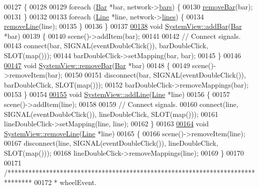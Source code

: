 \begin{DoxyCode}
00127 \{
00128 
00129   \textcolor{keywordflow}{foreach} (\hyperlink{class_bar}{Bar} *bar, network->\hyperlink{class_network_a7fe628f7de34a96235cbd3f2cee4aff2}{bars}) \{
00130     \hyperlink{group___graphics_ga1e96b08395a2f1b961dedbb3e8c99a50}{removeBar}(bar);
00131   \}
00132 
00133   \textcolor{keywordflow}{foreach} (\hyperlink{class_line}{Line} *line, network->\hyperlink{class_network_acda0fd42e712e460a08a0e96511ee7eb}{lines}) \{
00134     \hyperlink{group___graphics_ga4af1d763d9b9c02933e62d1f6231ad18}{removeLine}(line);
00135   \}
00136 \}
00137 
\hypertarget{systemview_8cpp_source_l00138}{}\hyperlink{group___graphics_gac4e02019d41c203c788ff1e6f3ee460e}{00138} \textcolor{keywordtype}{void} \hyperlink{group___graphics_gac4e02019d41c203c788ff1e6f3ee460e}{SystemView::addBar}(\hyperlink{class_bar}{Bar} *bar)
00139 \{
00140   scene()->addItem(bar);
00141 
00142   \textcolor{comment}{// Connect signals.}
00143   connect(bar, SIGNAL(eventDoubleClick()), barDoubleClick, SLOT(map()));
00144   barDoubleClick->setMapping(bar, bar);
00145 \}
00146 
\hypertarget{systemview_8cpp_source_l00147}{}\hyperlink{group___graphics_ga1e96b08395a2f1b961dedbb3e8c99a50}{00147} \textcolor{keywordtype}{void} \hyperlink{group___graphics_ga1e96b08395a2f1b961dedbb3e8c99a50}{SystemView::removeBar}(\hyperlink{class_bar}{Bar} *bar)
00148 \{
00149   scene()->removeItem(bar);
00150 
00151   disconnect(bar, SIGNAL(eventDoubleClick()), barDoubleClick, SLOT(map()));
00152   barDoubleClick->removeMappings(bar);
00153 \}
00154 
\hypertarget{systemview_8cpp_source_l00155}{}\hyperlink{group___graphics_gaed2fb15d518cab9a52ea1ee258846bfc}{00155} \textcolor{keywordtype}{void} \hyperlink{group___graphics_gaed2fb15d518cab9a52ea1ee258846bfc}{SystemView::addLine}(\hyperlink{class_line}{Line} *line)
00156 \{
00157   scene()->addItem(line);
00158 
00159   \textcolor{comment}{// Connect signals.}
00160   connect(line, SIGNAL(eventDoubleClick()), lineDoubleClick, SLOT(map()));
00161   lineDoubleClick->setMapping(line, line);
00162 \}
00163 
\hypertarget{systemview_8cpp_source_l00164}{}\hyperlink{group___graphics_ga4af1d763d9b9c02933e62d1f6231ad18}{00164} \textcolor{keywordtype}{void} \hyperlink{group___graphics_ga4af1d763d9b9c02933e62d1f6231ad18}{SystemView::removeLine}(\hyperlink{class_line}{Line} *line)
00165 \{
00166   scene()->removeItem(line);
00167   disconnect(line, SIGNAL(eventDoubleClick()), lineDoubleClick, SLOT(map()));
00168   lineDoubleClick->removeMappings(line);
00169 \}
00170 
00171 \textcolor{comment}{/*******************************************************************************}
00172 \textcolor{comment}{ * wheelEvent.}

\end{DoxyCode}
